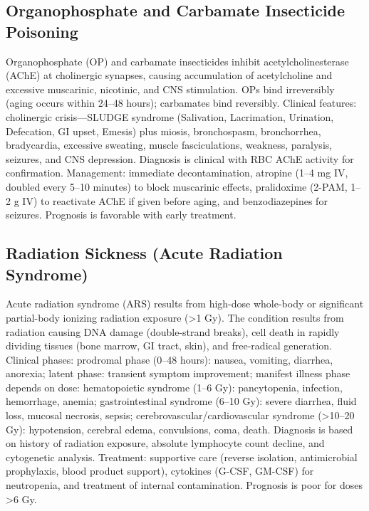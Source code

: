 \subsection{Organophosphate and Carbamate Insecticide Poisoning}
\label{sec:Organophosphate Poisoning}
Organophosphate (OP) and carbamate insecticides inhibit acetylcholinesterase (AChE) at cholinergic synapses, causing accumulation of acetylcholine and excessive muscarinic, nicotinic, and CNS stimulation. OPs bind irreversibly (aging occurs within 24--48 hours); carbamates bind reversibly. Clinical features: cholinergic crisis---SLUDGE syndrome (Salivation, Lacrimation, Urination, Defecation, GI upset, Emesis) plus miosis, bronchospasm, bronchorrhea, bradycardia, excessive sweating, muscle fasciculations, weakness, paralysis, seizures, and CNS depression. Diagnosis is clinical with RBC AChE activity for confirmation. Management: immediate decontamination, atropine (1--4 mg IV, doubled every 5--10 minutes) to block muscarinic effects, pralidoxime (2-PAM, 1--2 g IV) to reactivate AChE if given before aging, and benzodiazepines for seizures. Prognosis is favorable with early treatment.

\subsection{Radiation Sickness (Acute Radiation Syndrome)}
\label{sec:Radiation Sickness}
Acute radiation syndrome (ARS) results from high-dose whole-body or significant partial-body ionizing radiation exposure (>1 Gy). The condition results from radiation causing DNA damage (double-strand breaks), cell death in rapidly dividing tissues (bone marrow, GI tract, skin), and free-radical generation. Clinical phases: prodromal phase (0--48 hours): nausea, vomiting, diarrhea, anorexia; latent phase: transient symptom improvement; manifest illness phase depends on dose: hematopoietic syndrome (1--6 Gy): pancytopenia, infection, hemorrhage, anemia; gastrointestinal syndrome (6--10 Gy): severe diarrhea, fluid loss, mucosal necrosis, sepsis; cerebrovascular/cardiovascular syndrome (>10--20 Gy): hypotension, cerebral edema, convulsions, coma, death. Diagnosis is based on history of radiation exposure, absolute lymphocyte count decline, and cytogenetic analysis. Treatment: supportive care (reverse isolation, antimicrobial prophylaxis, blood product support), cytokines (G-CSF, GM-CSF) for neutropenia, and treatment of internal contamination. Prognosis is poor for doses >6 Gy.


